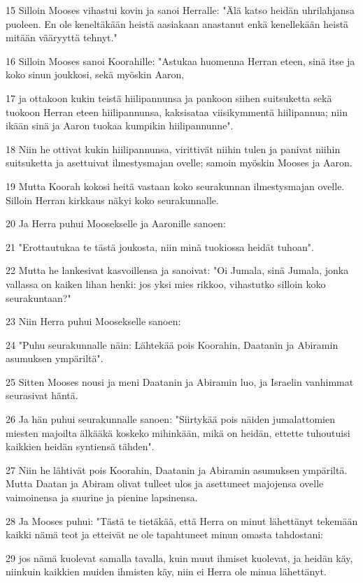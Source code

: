 \par 15 Silloin Mooses vihastui kovin ja sanoi Herralle: "Älä katso heidän uhrilahjansa puoleen. En ole keneltäkään heistä aasiakaan anastanut enkä kenellekään heistä mitään vääryyttä tehnyt."
\par 16 Silloin Mooses sanoi Koorahille: "Astukaa huomenna Herran eteen, sinä itse ja koko sinun joukkosi, sekä myöskin Aaron,
\par 17 ja ottakoon kukin teistä hiilipannunsa ja pankoon siihen suitsuketta sekä tuokoon Herran eteen hiilipannunsa, kaksisataa viisikymmentä hiilipannua; niin ikään sinä ja Aaron tuokaa kumpikin hiilipannunne".
\par 18 Niin he ottivat kukin hiilipannunsa, virittivät niihin tulen ja panivat niihin suitsuketta ja asettuivat ilmestysmajan ovelle; samoin myöskin Mooses ja Aaron.
\par 19 Mutta Koorah kokosi heitä vastaan koko seurakunnan ilmestysmajan ovelle. Silloin Herran kirkkaus näkyi koko seurakunnalle.
\par 20 Ja Herra puhui Moosekselle ja Aaronille sanoen:
\par 21 "Erottautukaa te tästä joukosta, niin minä tuokiossa heidät tuhoan".
\par 22 Mutta he lankesivat kasvoillensa ja sanoivat: "Oi Jumala, sinä Jumala, jonka vallassa on kaiken lihan henki: jos yksi mies rikkoo, vihastutko silloin koko seurakuntaan?"
\par 23 Niin Herra puhui Moosekselle sanoen:
\par 24 "Puhu seurakunnalle näin: Lähtekää pois Koorahin, Daatanin ja Abiramin asumuksen ympäriltä".
\par 25 Sitten Mooses nousi ja meni Daatanin ja Abiramin luo, ja Israelin vanhimmat seurasivat häntä.
\par 26 Ja hän puhui seurakunnalle sanoen: "Siirtykää pois näiden jumalattomien miesten majoilta älkääkä koskeko mihinkään, mikä on heidän, ettette tuhoutuisi kaikkien heidän syntiensä tähden".
\par 27 Niin he lähtivät pois Koorahin, Daatanin ja Abiramin asumuksen ympäriltä. Mutta Daatan ja Abiram olivat tulleet ulos ja asettuneet majojensa ovelle vaimoinensa ja suurine ja pienine lapsinensa.
\par 28 Ja Mooses puhui: "Tästä te tietäkää, että Herra on minut lähettänyt tekemään kaikki nämä teot ja etteivät ne ole tapahtuneet minun omasta tahdostani:
\par 29 jos nämä kuolevat samalla tavalla, kuin muut ihmiset kuolevat, ja heidän käy, niinkuin kaikkien muiden ihmisten käy, niin ei Herra ole minua lähettänyt.
